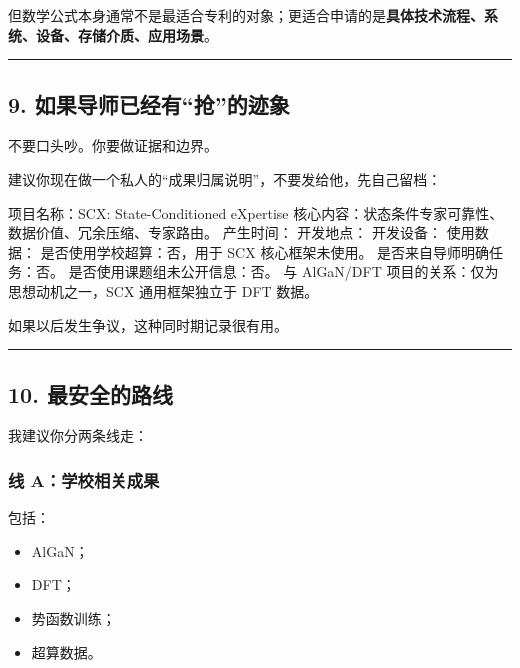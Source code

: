 \documentclass[
  12pt,
]{ctexart}
\newenvironment{Shaded}{}{}
\newcommand{\NormalTok}[1]{#1}
\providecommand{\tightlist}{%
  \setlength{\itemsep}{0pt}\setlength{\parskip}{0pt}}
\begin{document}
但数学公式本身通常不是最适合专利的对象；更适合申请的是\textbf{具体技术流程、系统、设备、存储介质、应用场景}。

\begin{center}\rule{0.5\linewidth}{0.5pt}\end{center}

\subsection{9.
如果导师已经有``抢''的迹象}\label{ux5982ux679cux5bfcux5e08ux5df2ux7ecfux6709ux62a2ux7684ux8ff9ux8c61}

不要口头吵。你要做证据和边界。

建议你现在做一个私人的``成果归属说明''，不要发给他，先自己留档：

\begin{Shaded}
\begin{Highlighting}[]
\NormalTok{项目名称：SCX: State{-}Conditioned eXpertise}
\NormalTok{核心内容：状态条件专家可靠性、数据价值、冗余压缩、专家路由。}
\NormalTok{产生时间：}
\NormalTok{开发地点：}
\NormalTok{开发设备：}
\NormalTok{使用数据：}
\NormalTok{是否使用学校超算：否，用于 SCX 核心框架未使用。}
\NormalTok{是否来自导师明确任务：否。}
\NormalTok{是否使用课题组未公开信息：否。}
\NormalTok{与 AlGaN/DFT 项目的关系：仅为思想动机之一，SCX 通用框架独立于 DFT 数据。}
\end{Highlighting}
\end{Shaded}

如果以后发生争议，这种同时期记录很有用。

\begin{center}\rule{0.5\linewidth}{0.5pt}\end{center}

\subsection{10.
最安全的路线}\label{ux6700ux5b89ux5168ux7684ux8defux7ebf}

我建议你分两条线走：

\subsubsection{线
A：学校相关成果}\label{ux7ebf-aux5b66ux6821ux76f8ux5173ux6210ux679c}

包括：

\begin{itemize}
\tightlist
\item
  AlGaN；
\item
  DFT；
\item
  势函数训练；
\item
  超算数据。
\end{itemize}
\end{document}

